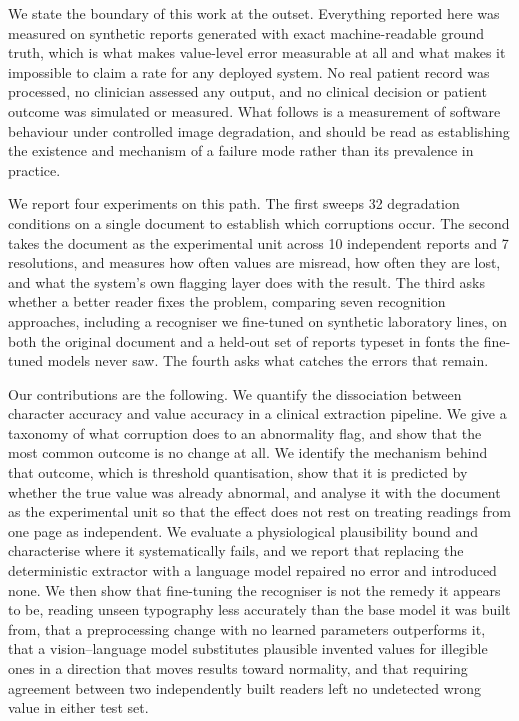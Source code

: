 \documentclass[11pt]{article}
\begin{document}
We state the boundary of this work at the outset. Everything reported here was measured on
synthetic reports generated with exact machine-readable ground truth, which is what makes
value-level error measurable at all and what makes it impossible to claim a rate for any
deployed system. No real patient record was processed, no clinician assessed any output, and no
clinical decision or patient outcome was simulated or measured. What follows is a measurement of
software behaviour under controlled image degradation, and should be read as establishing the
existence and mechanism of a failure mode rather than its prevalence in practice.

We report four experiments on this path. The first sweeps 32 degradation conditions on a single
document to establish which corruptions occur. The second takes the document as the
experimental unit across 10 independent reports and 7 resolutions, and measures how often
values are misread, how often they are lost, and what the system's own flagging layer does with
the result. The third asks whether a better reader fixes the problem, comparing seven
recognition approaches, including a recogniser we fine-tuned on synthetic laboratory lines, on
both the original document and a held-out set of reports typeset in fonts the fine-tuned models
never saw. The fourth asks what catches the errors that remain.

Our contributions are the following. We quantify the dissociation between character accuracy
and value accuracy in a clinical extraction pipeline. We give a taxonomy of what corruption
does to an abnormality flag, and show that the most common outcome is no change at all. We
identify the mechanism behind that outcome, which is threshold quantisation, show that it is
predicted by whether the true value was already abnormal, and analyse it with the document as
the experimental unit so that the effect does not rest on treating readings from one page as
independent. We evaluate a physiological plausibility bound and characterise where it
systematically fails, and we report that replacing the deterministic extractor with a language
model repaired no error and introduced none. We then show that fine-tuning the recogniser is not
the remedy it appears to be, reading unseen typography less accurately than the base model it
was built from, that a preprocessing change with no learned parameters outperforms it, that
a vision--language model substitutes plausible invented values for illegible ones in a direction
that moves results toward normality, and that requiring agreement between two independently
built readers left no undetected wrong value in either test set.
\end{document}
